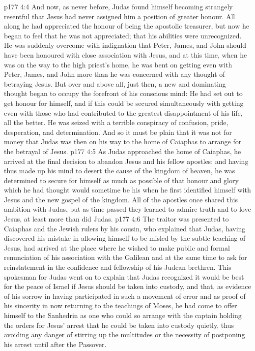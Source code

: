 \vs p177 4:4 And now, as never before, Judas found himself becoming strangely resentful that Jesus had never assigned him a position of greater honour. All along he had appreciated the honour of being the apostolic treasurer, but now he began to feel that he was not appreciated; that his abilities were unrecognized. He was suddenly overcome with indignation that Peter, James, and John should have been honoured with close association with Jesus, and at this time, when he was on the way to the high priest’s home, he was bent on getting even with Peter, James, and John more than he was concerned with any thought of betraying Jesus. But over and above all, just then, a new and dominating thought began to occupy the forefront of his conscious mind: He had set out to get honour for himself, and if this could be secured simultaneously with getting even with those who had contributed to the greatest disappointment of his life, all the better. He was seized with a terrible conspiracy of confusion, pride, desperation, and determination. And so it must be plain that it was not for money that Judas was then on his way to the home of Caiaphas to arrange for the betrayal of Jesus.
\vs p177 4:5 As Judas approached the home of Caiaphas, he arrived at the final decision to abandon Jesus and his fellow apostles; and having thus made up his mind to desert the cause of the kingdom of heaven, he was determined to secure for himself as much as possible of that honour and glory which he had thought would sometime be his when he first identified himself with Jesus and the new gospel of the kingdom. All of the apostles once shared this ambition with Judas, but as time passed they learned to admire truth and to love Jesus, at least more than did Judas.
\vs p177 4:6 The traitor was presented to Caiaphas and the Jewish rulers by his cousin, who explained that Judas, having discovered his mistake in allowing himself to be misled by the subtle teaching of Jesus, had arrived at the place where he wished to make public and formal renunciation of his association with the Galilean and at the same time to ask for reinstatement in the confidence and fellowship of his Judean brethren. This spokesman for Judas went on to explain that Judas recognized it would be best for the peace of Israel if Jesus should be taken into custody, and that, as evidence of his sorrow in having participated in such a movement of error and as proof of his sincerity in now returning to the teachings of Moses, he had come to offer himself to the Sanhedrin as one who could so arrange with the captain holding the orders for Jesus’ arrest that he could be taken into custody quietly, thus avoiding any danger of stirring up the multitudes or the necessity of postponing his arrest until after the Passover.
